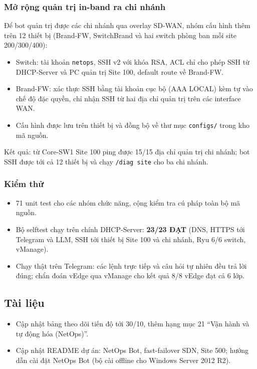 \subsubsection{Mở rộng quản trị in-band ra chi nhánh}

Để bot quản trị được các chi nhánh qua overlay SD-WAN, nhóm cấu hình thêm trên 12 thiết bị (Brand-FW, SwitchBrand và hai switch phòng ban mỗi site 200/300/400):

\begin{itemize}
    \item Switch: tài khoản \texttt{netops}, SSH v2 với khóa RSA, ACL chỉ cho phép SSH từ DHCP-Server và PC quản trị Site 100, default route về Brand-FW.
    \item Brand-FW: xác thực SSH bằng tài khoản cục bộ (AAA LOCAL) kèm tự vào chế độ đặc quyền, chỉ nhận SSH từ hai địa chỉ quản trị trên các interface WAN.
    \item Cấu hình được lưu trên thiết bị và đồng bộ về thư mục \texttt{configs/} trong kho mã nguồn.
\end{itemize}

Kết quả: từ Core-SW1 Site 100 ping được 15/15 địa chỉ quản trị chi nhánh; bot SSH được tới cả 12 thiết bị và chạy \texttt{/diag site} cho ba chi nhánh.

\subsubsection{Kiểm thử}

\begin{itemize}
    \item 71 unit test cho các nhóm chức năng, cộng kiểm tra cú pháp toàn bộ mã nguồn.
    \item Bộ selftest chạy trên chính DHCP-Server: \textbf{23/23 ĐẠT} (DNS, HTTPS tới Telegram và LLM, SSH tới thiết bị Site 100 và chi nhánh, Ryu 6/6 switch, vManage).
    \item Chạy thật trên Telegram: các lệnh trực tiếp và câu hỏi tự nhiên đều trả lời đúng; chẩn đoán vEdge qua vManage cho kết quả 8/8 vEdge đạt cả 6 lớp.
\end{itemize}

\subsection{Tài liệu}

\begin{itemize}
    \item Cập nhật bảng theo dõi tiến độ tới 30/10, thêm hạng mục 21 ``Vận hành và tự động hóa (NetOps)''.
    \item Cập nhật README dự án: NetOps Bot, fast-failover SDN, Site 500; hướng dẫn cài đặt NetOps Bot (bộ cài offline cho Windows Server 2012 R2).
\end{itemize}
